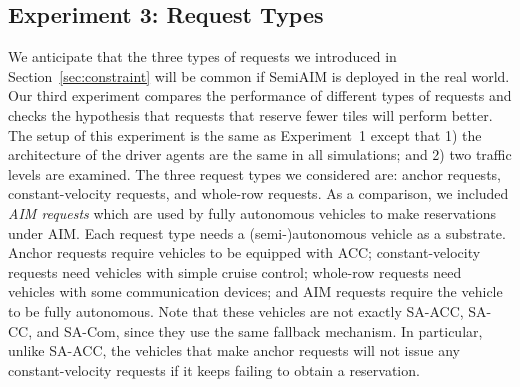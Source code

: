 




\subsection{Experiment 3: Request Types}

We anticipate that the three types of requests we introduced in
Section~\ref{sec:constraint} will be common if SemiAIM is deployed in
the real world.  Our third experiment compares the performance of
different types of requests and checks the hypothesis that requests
that reserve fewer tiles will perform better.  The setup of this
experiment is the same as Experiment~1 except that 1) the architecture
of the driver agents are the same in all simulations; and 2) two
traffic levels are examined.  The three request types we considered
are: anchor requests, constant-velocity requests, and whole-row
requests. As a comparison, we included \emph{AIM requests} which are
used by fully autonomous vehicles to make reservations under AIM. Each
request type needs a (semi-)autonomous vehicle as a substrate.  Anchor
requests require vehicles to be equipped with ACC; constant-velocity
requests need vehicles with simple cruise control; whole-row requests
need vehicles with some communication devices; and AIM requests
require the vehicle to be fully autonomous.  Note that these vehicles
are not exactly SA-ACC, SA-CC, and SA-Com, since they use the same
fallback mechanism.  In particular, unlike SA-ACC, the vehicles that
make anchor requests will not issue any constant-velocity requests if
it keeps failing to obtain a reservation.

